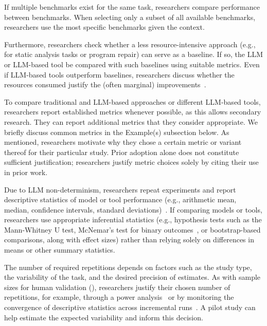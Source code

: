 If multiple benchmarks exist for the same task, researchers \should compare performance between benchmarks.
When selecting only a subset of all available benchmarks, researchers \should use the most specific benchmarks given the context.

Furthermore, researchers \should check whether a less resource-intensive approach (e.g., for static analysis tasks or program repair) can serve as a baseline. If so, the LLM or LLM-based tool \should be compared with such baselines using suitable metrics. Even if LLM-based tools outperform baselines, researchers \should discuss whether the resources consumed justify the (often marginal) improvements~\cite{DBLP:journals/cacm/Menzies25}.

To compare traditional and LLM-based approaches or different LLM-based tools, researchers \should report established metrics whenever possible, as this allows secondary research.
They can report additional metrics that they consider appropriate.
We briefly discuss common metrics in the Example(s) subsection below.
As mentioned, researchers \must motivate why they chose a certain metric or variant thereof for their particular study.
Prior adoption alone does not constitute sufficient justification; researchers \mustnot justify metric choices solely by citing their use in prior work.

Due to LLM non-determinism, researchers \should repeat experiments and report descriptive statistics of model or tool performance (e.g., arithmetic mean, median, confidence intervals, standard deviations)~\cite{DBLP:conf/nips/AgarwalSCCB21, bjarnason2026randomnessagenticevals}. If comparing models or tools, researchers \must use appropriate inferential statistics (e.g., hypothesis tests such as the Mann-Whitney U test, McNemar's test for binary outcomes~\cite{DBLP:conf/iclr/KublerBKZYKK26}, or bootstrap-based comparisons, along with effect sizes) rather than relying solely on differences in means or other summary statistics.

The number of required repetitions depends on factors such as the study type, the variability of the task, and the desired precision of estimates. As with sample sizes for human validation (\humanvalidation), researchers \should justify their chosen number of repetitions, for example, through a power analysis~\cite{Cohen1992, bjarnason2026randomnessagenticevals} or by monitoring the convergence of descriptive statistics across incremental runs~\cite{blackwell2024towards}. A pilot study can help estimate the expected variability and inform this decision.

